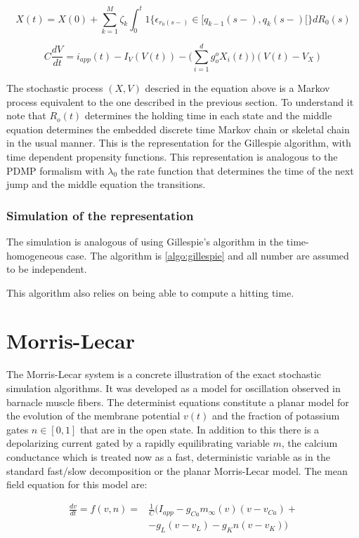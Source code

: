 	$$X(t) = X(0) + \sum\limits_{k=1}^M\zeta_k\int_0^t1\{\epsilon_{r_0(s-)}\in[q_{k-1}(s-), q_k(s-)[\}dR_0(s)$$

	$$C\frac{dV}{dt} = i_{app}(t)-I_V(V(t)) - \biggl(\sum\limits_{i=1}^dg_o^oX_i(t)\biggr)(V(t)-V_X)$$

	The stochastic process $(X, V)$ descried in the equation above is a Markov process equivalent to the one described in the previous section.
	To understand it note that $R_o(t)$ determines the holding time in each state and the middle equation determines the embedded discrete time Markov chain or skeletal chain in the usual manner.
	This is the representation for the Gillespie algorithm, with time dependent propensity functions.
	This representation is analogous to the PDMP formalism with $\lambda_0$ the rate function that determines the time of the next jump and the middle equation the transitions.

		\subsubsection{Simulation of the representation}
		The simulation is analogous of using Gillespie's algorithm in the time-homogeneous case.
		The algorithm is \ref{algo:gillespie} and all number are assumed to be independent.

		

		This algorithm also relies on being able to compute a hitting time.

\section{Morris-Lecar}
The Morris-Lecar system is a concrete illustration of the exact stochastic simulation algorithms.
It was developed as a model for oscillation observed in barnacle muscle fibers.
The determinist equations constitute a planar model for the evolution of the membrane potential $v(t)$ and the fraction of potassium gates $n\in[0,1]$ that are in the open state.
In addition to this there is a depolarizing current gated by a rapidly equilibrating variable $m$, the calcium conductance which is treated now as a fast, deterministic variable as in the standard fast/slow decomposition or the planar Morris-Lecar model.
The mean field equation for this model are:

\begin{align*}
	\frac{dv}{dt} = f(v, n) =& \frac{1}{C}(I_{app}-g_{Ca}m_{\infty}(v)(v-v_{Ca})+\\
													 &-g_L(v-v_L)-g_Kn(v-v_K))
\end{align*}

